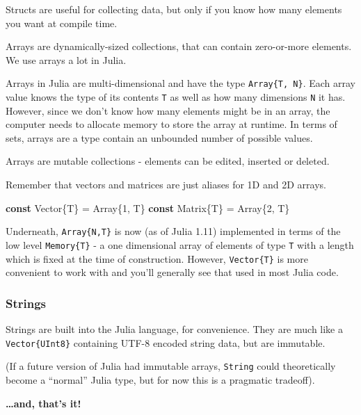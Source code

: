 \documentclass[
]{article}
\newenvironment{Shaded}{\begin{snugshade}}{\end{snugshade}}
\newcommand{\DataTypeTok}[1]{\textcolor[rgb]{0.68,0.00,0.00}{#1}}
\newcommand{\FloatTok}[1]{\textcolor[rgb]{0.68,0.00,0.00}{#1}}
\newcommand{\KeywordTok}[1]{\textcolor[rgb]{0.00,0.23,0.31}{\textbf{#1}}}
\newcommand{\NormalTok}[1]{\textcolor[rgb]{0.00,0.23,0.31}{#1}}
\newcommand{\OperatorTok}[1]{\textcolor[rgb]{0.37,0.37,0.37}{#1}}
\begin{document}
Structs are useful for collecting data, but only if you know how many
elements you want at compile time.

Arrays are dynamically-sized collections, that can contain zero-or-more
elements. We use arrays a lot in Julia.

Arrays in Julia are multi-dimensional and have the type
\texttt{Array\{T,\ N\}}. Each array value knows the type of its contents
\texttt{T} as well as how many dimensions \texttt{N} it has. However,
since we don't know how many elements might be in an array, the computer
needs to allocate memory to store the array at runtime. In terms of
sets, arrays are a type contain an unbounded number of possible values.

Arrays are mutable collections - elements can be edited, inserted or
deleted.

Remember that vectors and matrices are just aliases for 1D and 2D
arrays.

\begin{Shaded}
\begin{Highlighting}[]
\KeywordTok{const} \DataTypeTok{Vector}\NormalTok{\{T\} }\OperatorTok{=} \DataTypeTok{Array}\NormalTok{\{}\FloatTok{1}\NormalTok{, T\}}
\KeywordTok{const} \DataTypeTok{Matrix}\NormalTok{\{T\} }\OperatorTok{=} \DataTypeTok{Array}\NormalTok{\{}\FloatTok{2}\NormalTok{, T\}}
\end{Highlighting}
\end{Shaded}

Underneath, \texttt{Array\{N,T\}} is now (as of Julia 1.11) implemented
in terms of the low level \texttt{Memory\{T\}} - a one dimensional array
of elements of type \texttt{T} with a length which is fixed at the time
of construction. However, \texttt{Vector\{T\}} is more convenient to
work with and you'll generally see that used in most Julia code.

\subsubsection{Strings}\label{strings}

Strings are built into the Julia language, for convenience. They are
much like a \texttt{Vector\{UInt8\}} containing UTF-8 encoded string
data, but are immutable.

(If a future version of Julia had immutable arrays, \texttt{String}
could theoretically become a ``normal'' Julia type, but for now this is
a pragmatic tradeoff).

\textbf{\ldots and, that's it!}
\end{document}

